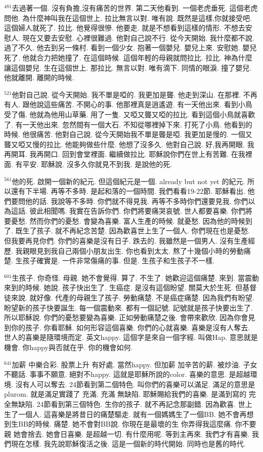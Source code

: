 \documentclass{book}
\begin{document}
$^{481}$去過著一個.
沒有負擔,沒有痛苦的世界.
第二天他看到.
一個老虎垂死.
這個老虎問他.
為什麼神叫我在這個世上.
拉比無言以對.
唯有說.
既然是這樣,你就接受吧.
這個婦人就死了.
拉比.
他覺得很慘.
他要走.
就是不想看到這樣的情形.
不想去安慰人.
現在又要去安慰.
心裡很難過.
他對自己說不行.
從今天開始.
我什麼都不說.
過了不久.
他去到另一條村.
看到一個少女.
抱著一個嬰兒.
嬰兒上來.
安慰她.
嬰兒死了.
他就合力把她撞了.
在這個時候.
這個年輕的母親就問拉比.
拉比.
神為什麼讓這個嬰兒.
生在這個世上.
那拉比.
無言以對.
唯有滴下.
同情的眼淚.
撞了嬰兒.
他就離開.
離開的時候.

$^{521}$他對自己說.
從今天開始.
我不單是啞的.
我更加是聾.
他走到深山.
在那裡.
不再有人.
跟他說這些痛苦.
不開心的事.
他那裡真是逍遙遊.
有一天他出來.
看到小鳥受了傷.
他就為他用山草藥.
用了一隻.
又啞又聾又啞的拉比.
看到這個小鳥就喜歡了.
有一天他出來.
忽然間有一個大石.
不知從哪裡掉下來.
打死了小鳥.
他看到的時候.
他很痛苦.
他對自己說.
從今天開始我不單是聾是啞.
我更加是慢的.
一個又聾又啞又慢的拉比.
他能夠做些什麼.
他想了沒多久.
他對自己說.
好,我再開眼.
我再開耳.
我再開口.
回到會堂裡面.
繼續做拉比.
耶穌說你們在世上有苦難.
在我裡面.
有平安.
耶穌說.
沒多久你就見不到我.
是說他的死.

$^{561}$他的死.
啟開一個新的紀元.
但這個紀元是一個.
already but not yet 的紀元.
所以還有下半場.
再等不多時.
是起和落的一個時間.
我們看看19-22節.
耶穌看出.
他們要問他的話.
我說等不多時.
你們就不得見我.
再等不多時你們還要見我.
你們以為這話.
彼此相聞嗎.
我實在告訴你們.
你們將要痛哭哀號.
世人都要喜樂.
你們將要憂愁.
然而你們的憂愁.
會變為喜樂.
富人生產的時候.
就憂愁.
因為他的時候到了.
既生了孩子.
就不再紀念苦楚.
因為歡喜世上生了一個人.
你們現在也是憂愁.
但我要再見你們.
你們的喜樂是沒有日子.
跌去的.
我雖然是一個男人.
沒有生產經歷.
我親眼見到我自己兩個小朋友出生.
你也看到太太.
熬了十幾個小時的勞動痛楚.
生孩子確實是.
一件非常傷痛的事.
但是.
生孩子和生孩子不一樣.

$^{601}$生孩子.
你奇怪.
母親.
她不會覺得.
算了.
不生了.
她歡迎這個痛楚.
來到.
當震動來到的時候.
她說.
孩子快出生了.
生癌症.
是沒有這個盼望.
關莫大於生死.
但基督徒來說.
就好像.
代產的母親生了孩子.
勞動痛楚.
不是癌症痛楚.
因為我們有盼望.
盼望新的孩子快要誕生.
每一個震動來.
都有一個記號.
記號就是孩子快要出生了.
所以耶穌說.
你們的憂愁要變為喜樂.
正如勞動痛楚之後.
會帶來歡欣.
因為你會見到你的孩子.
你看耶穌.
如何形容這個喜樂.
你們的心就喜樂.
喜樂是沒有人奪去.
世人的喜樂是隨環境而定.
英文happy.
這個字是來自一個字經.
叫做Hap.
意思就是機會.
你happy與否就在乎.
你的機會如何.

$^{641}$加薪 中樂合彩.
股票上升 有好處.
當然happy.
但加薪 加辛苦的薪.
被炒油.
子女不聽話.
事事不願意.
絕對不happy.
這就是耶穌所說的color.
喜樂的意思.
是超越環境.
沒有人可以奪去.
24節看到第二個特色.
叫你們的喜樂可以滿足.
滿足的意思是plurom.
就是滿足實踐了 充滿.
充滿 無缺陷.
耶穌賜給我們的喜樂.
是滿到寫的 完全無缺陷.
24節看到第三個特色.
生你的孩子.
就不再記念那副錯.
因為歡喜.
世上生了一個人.
這喜樂是將昔日的痛楚驅走.
就有一個媽媽生了一個BB.
她不會再想到生BB的時候.
痛楚.
她不會對BB說.
你現在是最壞的生 你弄得我這麼痛.
你不要親 她會捨去.
她會日喜樂.
是超越一切.
有什麼用呢.
等到主再來.
我們才有喜樂.
我們現在怎樣.
我先說耶穌復活之後.
這是一個新的時代開始.
同時也是舊的時代.
\end{document}
